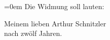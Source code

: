 \begin{ledgroupsized}[t]{13cm}
           \leftskip=0em{}\pstart
           \noindent{}{\pb}Die Widmung soll lauten:\pend
           \begin{mdbar}\pstart
           \noindent{}\centering{}Meinem lieben Arthur Schnitzler{\\}nach zwölf Jahren.\pend
           \end{mdbar}\endnumbering{}\end{ledgroupsized}  \newcommand{\dateiname}{L01286}\newcommand{\titel}{Hermann Bahr an Arthur Schnitzler, 4. 4. [1903]}\newcommand{\editorInnen}{ Kurt Ifkovits,  Martin Anton Müller}
            \footnotesize
\begin{ledgroupsized}[t]{11.5cm}
\end{ledgroupsized}
         
      